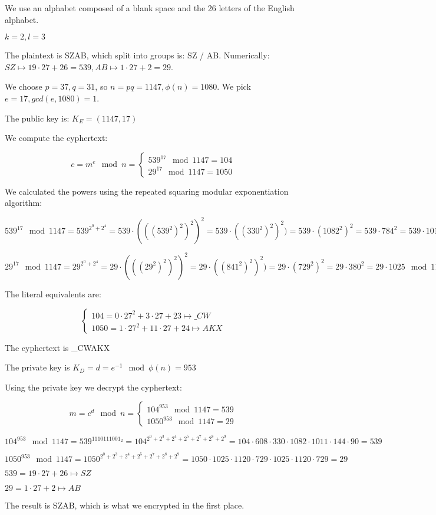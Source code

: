 \documentclass[a4paper,12pt]{article}
\author{Roland Szabo, gr. 235}
\begin{document}
We use an alphabet composed of a blank space and the 26 letters of the English alphabet.

$ k = 2, l = 3 $

The plaintext is SZAB, which split into groups is: SZ / AB. Numerically: $ SZ \mapsto 19 \cdot 27 + 26 = 539, AB \mapsto 1 \cdot 27 + 2  = 29$.

We choose $p = 37, q = 31$, so $ n = p q = 1147 , \phi(n) = 1080$. We pick $ e = 17 , gcd(e,1080) = 1 $. 

The public key is: $ K_E = (1147, 17) $

We compute the cyphertext:

$$
c = m^e \mod n = 
\left\{\begin{matrix}
 539^{17} \mod 1147 = 104  \\ 
 29^{17} \mod 1147 = 1050
\end{matrix}\right.
$$

We calculated the powers using the repeated squaring modular exponentiation algorithm: 

$ 539^{17} \mod 1147 = 539^{2^0 +2^4} = 539 \cdot (((539^2)^2)^2)^2 = 539 \cdot ((330^2)^2)^2) = 
 539 \cdot (1082^2)^2 = 539 \cdot 784^2 = 539 \cdot 1011 \mod 1147  = 104 $
 
$ 29^{17} \mod 1147 = 29^{2^0 +2^4} = 29 \cdot (((29^2)^2)^2)^2 = 29 \cdot ((841^2)^2)^2) = 
 29 \cdot (729^2)^2 = 29 \cdot 380^2 = 29 \cdot 1025 \mod 1147  = 1050 $
 
 
The literal equivalents are: 

$$ 
\left\{\begin{matrix}
104 = 0 \cdot 27^2 + 3 \cdot 27 + 23 \mapsto \_ C W \\
1050 = 1 \cdot 27^2 + 11 \cdot 27 + 24 \mapsto A K X 
\end{matrix}\right. $$

The cyphertext is \_CWAKX

The private key is $ K_D = d = e^{-1} \mod \phi(n) = 953 $

Using the private key we decrypt the cyphertext:

$$
m = c^d \mod n = 
\left\{\begin{matrix}
 104^{953} \mod 1147 = 539  \\ 
 1050^{953} \mod 1147 = 29
\end{matrix}\right.
$$

$ 104^{953} \mod 1147 = 539^{1110111001_2} = 104^{2^0 + 2^3 + 2^4+2^5 +2^7 +2^8 + 2^9} = 104 \cdot 608 \cdot 330 \cdot 1082 \cdot 1011 \cdot 144 \cdot 90 = 539 $
 
$ 1050 ^{953} \mod 1147 = 1050^{2^0 + 2^3 + 2^4+2^5 +2^7 +2^8 + 2^9} = 1050 \cdot 1025 \cdot 1120 \cdot 729 \cdot 1025 \cdot 1120 \cdot 729 = 29 $

$ 539 = 19 \cdot 27 + 26 \mapsto SZ $

$ 29 = 1 \cdot 27 +2 \mapsto AB $ 

The result is SZAB, which is what we encrypted in the first place. 
\end{document}

